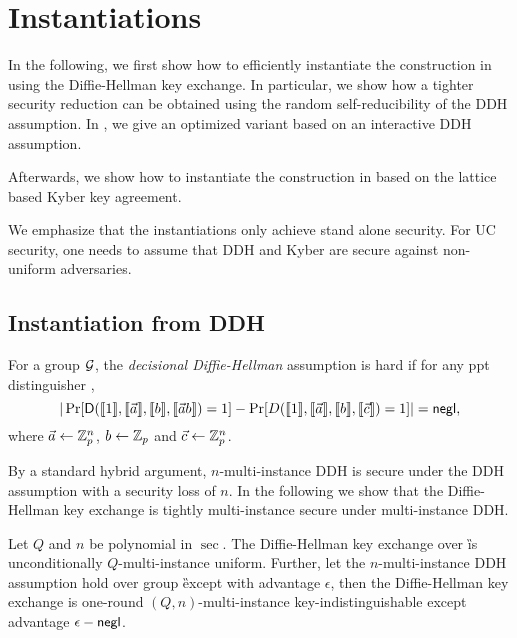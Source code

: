 \section{Instantiations}\label{sec:inst}
In the following, we first show how to efficiently instantiate the construction in  using the Diffie-Hellman key exchange. In particular, we show how a tighter security reduction can be obtained using the random self-reducibility of the DDH assumption. In , we give an optimized variant based on an interactive DDH assumption.

Afterwards, we show how to instantiate the construction in  based on the lattice based Kyber key agreement. 

We emphasize that the instantiations only achieve stand alone security. For UC security, one needs to assume that DDH and Kyber are secure against non-uniform adversaries. 


\subsection{Instantiation from DDH}



\begin{definition}
For a group $\mathcal{G}$, the \emph{decisional Diffie-Hellman} assumption is hard if for any ppt distinguisher \D,
$$
|\Pr[ \mathsf D(\llbracket 1\rrbracket,\llbracket \vec{a}\rrbracket,\llbracket b\rrbracket,\llbracket \vec{a}b\rrbracket)=1]-\Pr[ D(\llbracket 1\rrbracket,\llbracket \vec{a}\rrbracket,\llbracket b\rrbracket,\llbracket \vec{c}\rrbracket)=1]|=\mathsf{negl},
$$
where $\vec{a}\leftarrow\mathbb Z_p^n$, $b\leftarrow\mathbb Z_p$ and $\vec{c}\leftarrow\mathbb Z_p^n$.
\end{definition}


By a standard hybrid argument, $n$-multi-instance DDH is secure under the DDH assumption with a security loss of $n$. In the following we show that the Diffie-Hellman key exchange is tightly multi-instance secure under multi-instance DDH. 

\begin{lemma}\label{lem:DDH}
Let $Q$ and $n$ be polynomial in $\sec$.
The Diffie-Hellman key exchange over \G is unconditionally $Q$-multi-instance uniform. Further, let the $n$-multi-instance DDH assumption hold over group \G except with advantage $\epsilon$, then the Diffie-Hellman key exchange is one-round $(Q,n)$-multi-instance key-indistinguishable except advantage $\epsilon-\mathsf{negl}$. 
\end{lemma}

